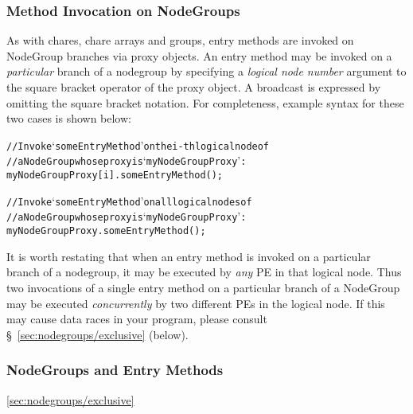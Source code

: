 \subsubsection{Method Invocation on NodeGroups}

As with chares, chare arrays and groups, entry methods are invoked on
NodeGroup branches via proxy objects. 
An entry method may be invoked on a {\em particular} branch of a
nodegroup by specifying a {\em logical node number} argument
to the square bracket operator of the proxy object. A broadcast is expressed
by omitting the square bracket notation. For completeness, example syntax for these
two cases is shown below:

\begin{alltt}
 // Invoke `someEntryMethod' on the i-th logical node of
 // a NodeGroup whose proxy is `myNodeGroupProxy':
 myNodeGroupProxy[i].someEntryMethod();

 // Invoke `someEntryMethod' on all logical nodes of
 // a NodeGroup whose proxy is `myNodeGroupProxy':
 myNodeGroupProxy.someEntryMethod();
\end{alltt}

It is worth restating that when an entry method is
invoked on a particular branch of a nodegroup,
it may be executed by {\em any} PE in that logical node. Thus two invocations of
a single entry method on a particular branch of a
NodeGroup may be executed {\em concurrently} by two
different PEs in the logical node. If this may cause data races in your
program, please consult \S~\ref{sec:nodegroups/exclusive} (below).


\subsubsection{NodeGroups and  Entry Methods}
\ref{sec:nodegroups/exclusive}


